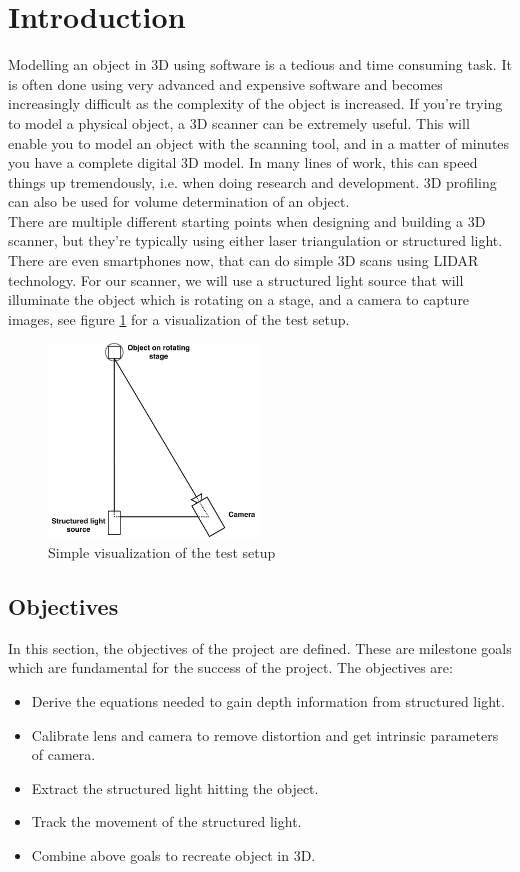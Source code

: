
\section{Introduction}
Modelling an object in 3D using software is a tedious and time consuming task. It is often done using very advanced and expensive software and becomes increasingly difficult as the complexity of the object is increased. If you're trying to model a physical object, a 3D scanner can be extremely useful. 
This will enable you to model an object with the scanning tool, and in a matter of minutes you have a complete digital 3D model. In many lines of work, this can speed things up tremendously, i.e. when doing research and development. 3D profiling can also be used for volume determination of an object.\\


There are multiple different starting points when designing and building a 3D scanner, but they're typically using either laser triangulation or structured light. There are even smartphones now, that can do simple 3D scans using LIDAR technology.
For our scanner, we will use a structured light source that will illuminate the object which is rotating on a stage, and a camera to capture images, see figure \ref{fig:setupintro} for a visualization of the test setup. 
\begin{figure}[h]
    \centering
    \includegraphics[width=0.5\textwidth]{figures/Introduction/setupIntroduction.pdf}
    \caption{Simple visualization of the test setup}
    \label{fig:setupintro}
\end{figure}

\newpage
\subsection{Objectives}
In this section, the objectives of the project are defined. These are milestone goals which are fundamental for the success of the project. The objectives are:
\begin{itemize}

    \item Derive the equations needed to gain depth information from structured light.
    \item Calibrate lens and camera to remove distortion and get intrinsic parameters of camera.
    \item Extract the structured light hitting the object.
    \item Track the movement of the structured light. 
    \item Combine above goals to recreate object in 3D.

\end{itemize}
